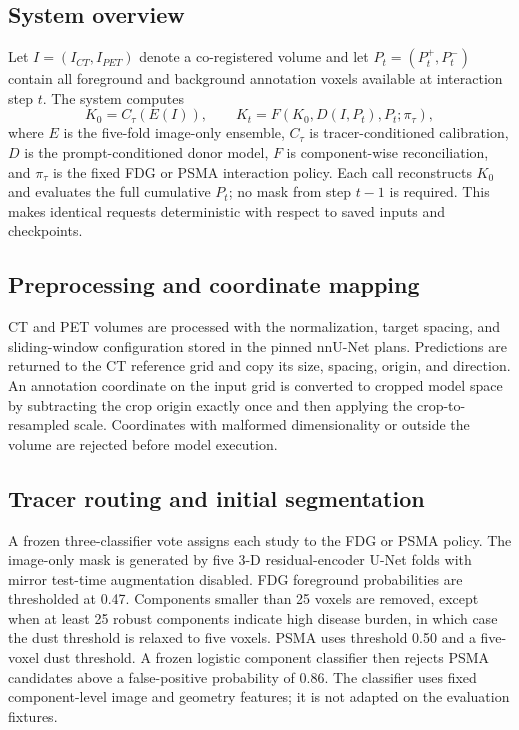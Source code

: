 \documentclass[runningheads]{llncs}
\begin{document}
\subsection{System overview}

Let $I=(I_{CT},I_{PET})$ denote a co-registered volume and let
$P_t=(P_t^+,P_t^-)$ contain all foreground and background annotation voxels
available at interaction step $t$. The system computes
\begin{equation}
K_0 = C_{\tau}(E(I)), \qquad
K_t = F(K_0,D(I,P_t),P_t;\pi_{\tau}),
\end{equation}
where $E$ is the five-fold image-only ensemble, $C_{\tau}$ is
tracer-conditioned calibration, $D$ is the prompt-conditioned donor model,
$F$ is component-wise reconciliation, and $\pi_{\tau}$ is the fixed FDG or
PSMA interaction policy. Each call reconstructs $K_0$ and evaluates the full
cumulative $P_t$; no mask from step $t-1$ is required. This makes identical
requests deterministic with respect to saved inputs and checkpoints.

\subsection{Preprocessing and coordinate mapping}

CT and PET volumes are processed with the normalization, target spacing, and
sliding-window configuration stored in the pinned nnU-Net plans. Predictions
are returned to the CT reference grid and copy its size, spacing, origin, and
direction. An annotation coordinate on the input grid is converted to cropped
model space by subtracting the crop origin exactly once and then applying the
crop-to-resampled scale. Coordinates with malformed dimensionality or outside
the volume are rejected before model execution.

\subsection{Tracer routing and initial segmentation}

A frozen three-classifier vote assigns each study to the FDG or PSMA policy.
The image-only mask is generated by five 3-D residual-encoder U-Net folds with
mirror test-time augmentation disabled. FDG foreground probabilities are
thresholded at 0.47. Components smaller than 25 voxels are removed, except
when at least 25 robust components indicate high disease burden, in which case
the dust threshold is relaxed to five voxels. PSMA uses threshold 0.50 and a
five-voxel dust threshold. A frozen logistic component classifier then rejects
PSMA candidates above a false-positive probability of 0.86. The classifier
uses fixed component-level image and geometry features; it is not adapted on
the evaluation fixtures.
\end{document}
